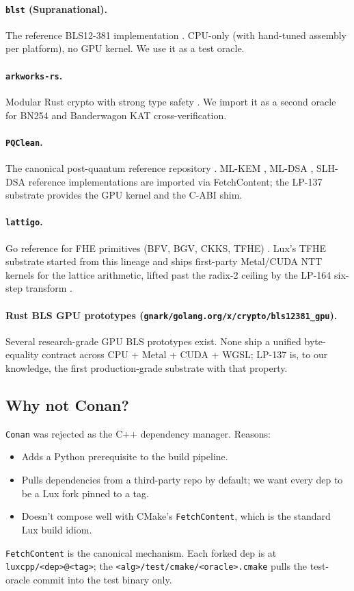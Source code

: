 \paragraph{\texttt{blst} (Supranational).} The reference BLS12-381 implementation \cite{blst}. CPU-only (with hand-tuned assembly per platform), no GPU kernel. We use it as a test oracle.

\paragraph{\texttt{arkworks-rs}.} Modular Rust crypto with strong type safety \cite{arkworks}. We import it as a second oracle for BN254 and Banderwagon KAT cross-verification.

\paragraph{\texttt{PQClean}.} The canonical post-quantum reference repository \cite{pqclean}. ML-KEM \cite{fips203}, ML-DSA \cite{fips204}, SLH-DSA \cite{fips205} reference implementations are imported via FetchContent; the LP-137 substrate provides the GPU kernel and the C-ABI shim.

\paragraph{\texttt{lattigo}.} Go reference for FHE primitives (BFV, BGV, CKKS, TFHE) \cite{lattigo}. Lux's TFHE substrate started from this lineage and ships first-party Metal/CUDA NTT kernels for the lattice arithmetic, lifted past the radix-2 ceiling by the LP-164 six-step transform \cite{lp164,longa2016}.

\paragraph{Rust BLS GPU prototypes (\texttt{gnark/golang.org/x/crypto/bls12381\_gpu}).} Several research-grade GPU BLS prototypes exist. None ship a unified byte-equality contract across CPU + Metal + CUDA + WGSL; LP-137 is, to our knowledge, the first production-grade substrate with that property.

\subsection{Why not Conan?}

\texttt{Conan} was rejected as the C++ dependency manager. Reasons:

\begin{itemize}
\item Adds a Python prerequisite to the build pipeline.
\item Pulls dependencies from a third-party repo by default; we want every dep to be a Lux fork pinned to a tag.
\item Doesn't compose well with CMake's \texttt{FetchContent}, which is the standard Lux build idiom.
\end{itemize}

\texttt{FetchContent} is the canonical mechanism. Each forked dep is at \texttt{luxcpp/<dep>@<tag>}; the \texttt{<alg>/test/cmake/<oracle>.cmake} pulls the test-oracle commit into the test binary only.

